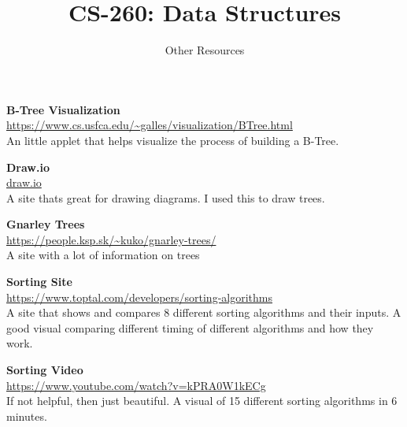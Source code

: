 \documentclass[10pt,letterpaper,oneside]{article}
\title{CS-260: Data Structures}
\author{Other Resources}
\date{}
\begin{document}
\maketitle

\textbf{B-Tree Visualization} \\
\url{https://www.cs.usfca.edu/~galles/visualization/BTree.html} \\
An little applet that helps visualize the process of building a B-Tree.
\vspace{5mm}

\textbf{Draw.io} \\
\url{draw.io} \\
A site thats great for drawing diagrams.
I used this to draw trees.
\vspace{5mm}

\textbf{Gnarley Trees} \\
\url{https://people.ksp.sk/~kuko/gnarley-trees/} \\
A site with a lot of information on trees
\vspace{5mm}

\textbf{Sorting Site} \\
\url{https://www.toptal.com/developers/sorting-algorithms} \\
A site that shows and compares 8 different sorting algorithms and their inputs.
A good visual comparing different timing of different algorithms and how they
work.
\vspace{5mm}

\textbf{Sorting Video} \\
\url{https://www.youtube.com/watch?v=kPRA0W1kECg} \\
If not helpful, then just beautiful.
A visual of 15 different sorting algorithms in 6 minutes.
\end{document}
